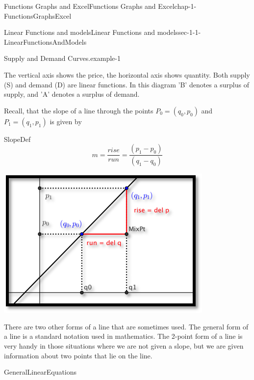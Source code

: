 \documentclass[oneside,10pt,]{book}
\numberwithin{equation}{section}
\begin{document}
\begin{chapterptx}{Functions Graphs and Excel}{}{Functions Graphs and Excel}{}{}{chap-1-FunctionsGraphsExcel}
\begin{sectionptx}{Linear Functions and models}{}{Linear Functions and models}{}{}{sec-1-1-LinearFunctionsAndModels}
\begin{example}{Supply and Demand Curves.}{example-1}
\begin{sidebyside}{1}{0.25}{0.25}{0}
\begin{sbspanel}{0.5}
\end{sbspanel}%
\end{sidebyside}%
\par
\hypertarget{p-40}{}%
The vertical axis shows the price, the horizontal axis shows quantity. Both supply (S) and demand (D) are linear functions. In this diagram 'B' denotes a surplus of supply, and 'A' denotes a surplus of demand.%
\end{example}
\hypertarget{p-41}{}%
Recall, that the slope of a line through the points \(P_0=(q_0,p_0)\) and \(P_1=(q_1,p_1)\) is given by%
\begin{assemblage}{}{SlopeDef}%
\hypertarget{p-42}{}%
%
\begin{equation*}
m=\frac{rise}{run}=\frac{(p_1-p_0)}{(q_1-q_0 )}
\end{equation*}
%
\end{assemblage}
\begin{sidebyside}{1}{0.25}{0.25}{0}%
\begin{sbspanel}{0.5}%
\includegraphics[width=1\linewidth]{images/sec1-1-slope.png}
\end{sbspanel}%
\end{sidebyside}%
\par
\hypertarget{p-43}{}%
There are two other forms of a line that are sometimes used. The general form of a line is a standard notation used in mathematics. The 2-point form of a line is very handy in those situations where we are not given a slope, but we are given information about two points that lie on the line.%
\begin{assemblage}{}{GeneralLinearEquations}%
\leavevmode%
\begin{sidebyside}{1}{0}{0}{0}%

\end{sidebyside}
\end{assemblage}
\end{sectionptx}
\end{chapterptx}
\end{document}
